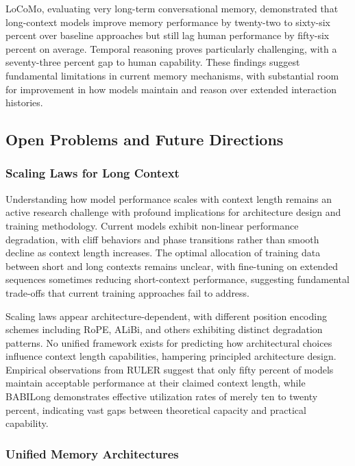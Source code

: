 LoCoMo, evaluating very long-term conversational memory, demonstrated that long-context models improve memory performance by twenty-two to sixty-six percent over baseline approaches but still lag human performance by fifty-six percent on average. Temporal reasoning proves particularly challenging, with a seventy-three percent gap to human capability. These findings suggest fundamental limitations in current memory mechanisms, with substantial room for improvement in how models maintain and reason over extended interaction histories.

\subsection{Open Problems and Future Directions}

\subsubsection{Scaling Laws for Long Context}

Understanding how model performance scales with context length remains an active research challenge with profound implications for architecture design and training methodology. Current models exhibit non-linear performance degradation, with cliff behaviors and phase transitions rather than smooth decline as context length increases. The optimal allocation of training data between short and long contexts remains unclear, with fine-tuning on extended sequences sometimes reducing short-context performance, suggesting fundamental trade-offs that current training approaches fail to address.

Scaling laws appear architecture-dependent, with different position encoding schemes including RoPE, ALiBi, and others exhibiting distinct degradation patterns. No unified framework exists for predicting how architectural choices influence context length capabilities, hampering principled architecture design. Empirical observations from RULER suggest that only fifty percent of models maintain acceptable performance at their claimed context length, while BABILong demonstrates effective utilization rates of merely ten to twenty percent, indicating vast gaps between theoretical capacity and practical capability.

\subsubsection{Unified Memory Architectures}

